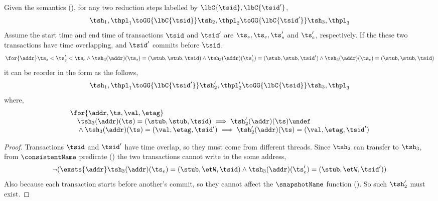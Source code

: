 \begin{lem}
\label{lem:reorder-concurrency}
Given the semantics (), for any two reduction steps labelled by \( \lbC{\tsid}, \lbC{\tsid'} \),
\[
    \tsh_{1}, \thpl_{1} \toGG{\lbC{\tsid}} \tsh_{2}, \thpl_{2} \toGG{\lbC{\tsid'}} \tsh_{3}, \thpl_{3}
\]
Assume the start time and end time of transactions \( \tsid \) and \( \tsid' \) are \( \ts_{s}, \ts_{e}, \ts_{s}' \) and \( \ts_{e}' \), respectively.
If the these two transactions have time overlapping, and \( \tsid' \) commits before \( \tsid \),  \ie
\[
\begin{array}{@{}l@{}}
    \for{\addr} 
    \ts_{s} < \ts_{e}' < \ts_{e}
    \land \tsh_{3}(\addr)(\ts_{s}) = (\stub, \stub, \tsid)
    \land \tsh_{3}(\addr)(\ts_{e}') = (\stub, \stub, \tsid')
    \land \tsh_{3}(\addr)(\ts_{e}) = (\stub, \stub, \tsid)
\end{array}
\]
it can be reorder in the form as the follows,
\[
\begin{array}{@{}l@{}}
    \tsh_{1}, \thpl_{1} \toGG{\lbC{\tsid'}} \tsh_{2}', \thpl_{2}' \toGG{\lbC{\tsid}} \tsh_{3}, \thpl_{3}
\end{array}
\]
where,
\[
\begin{array}{@{}l@{}}
    \for{\addr, \ts,\val,\etag} \\
    \quad \tsh_{3}(\addr)(\ts) = (\stub, \stub, \tsid) \implies \tsh_{2}'(\addr)(\ts) \undef \\ 
    \quad {} \land \tsh_{3}(\addr)(\ts) = (\val, \etag, \tsid') \implies \tsh_{2}'(\addr)(\ts) = (\val, \etag, \tsid')
\end{array}
\]
\end{lem}
\begin{proof}
Transactions \( \tsid \) and \( \tsid' \) have time overlap, so they must come from different threads.
Since \( \tsh_{2} \) can transfer to \( \tsh_{3} \), from \( \consistentName \) predicate () the two transactions cannot write to the some address,
\[
    \neg (\exsts{\addr} \tsh_{3}(\addr)(\ts_{e}) = (\stub, \etW, \tsid) \land  \tsh_{3}(\addr)(\ts_{e}') = (\stub, \etW, \tsid'))
\]
Also because each transaction starts before another's commit, so they cannot affect the \( \snapshotName \) function ().
So such \( \tsh_{2}' \) must exist.
\end{proof}


